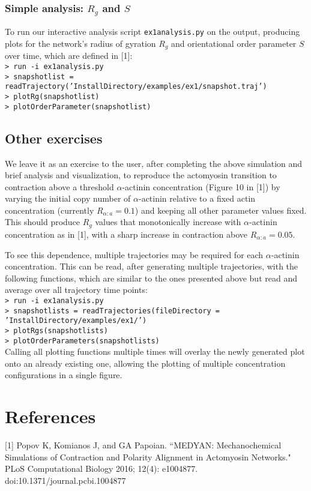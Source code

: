 \documentclass[11pt, oneside]{article}   	%
\begin{document}
\subsubsection{Simple analysis: $R_g$ and $S$}

To run our interactive analysis script \texttt{ex1analysis.py} on the output, producing plots for the network's radius of gyration $R_g$ and orientational order parameter $S$ over time, which are defined in [1]:\\

\indent \texttt{> run -i ex1analysis.py}\\
\indent \texttt{> snapshotlist = readTrajectory('InstallDirectory/examples/ex1/snapshot.traj')}\\
\indent \texttt{> plotRg(snapshotlist)}\\
\indent \texttt{> plotOrderParameter(snapshotlist)}\\

\subsection{Other exercises}

We leave it as an exercise to the user, after completing the above simulation and brief analysis and visualization, to reproduce the actomyosin transition to contraction above a threshold $\alpha$-actinin concentration (Figure 10 in [1]) by varying the initial copy number of $\alpha$-actinin relative to a fixed actin concentration (currently $R_{\alpha:a}=0.1$) and keeping all other parameter values fixed. This should produce $R_g$ values that monotonically increase with $\alpha$-actinin concentration as in [1], with a sharp increase in contraction above $R_{\alpha:a}=0.05$.

To see this dependence, multiple trajectories may be required for each $\alpha$-actinin concentration. This can be read, after generating multiple trajectories, with the following functions, which are similar to the ones presented above but read and average over all trajectory time points:\\

\indent \texttt{> run -i ex1analysis.py}\\
\indent \texttt{> snapshotlists = readTrajectories(fileDirectory = 'InstallDirectory/examples/ex1/')}\\
\indent \texttt{> plotRgs(snapshotlists)}\\
\indent \texttt{> plotOrderParameters(snapshotlists)}\\

\noindent Calling all plotting functions multiple times will overlay the newly generated plot onto an already existing one, allowing the plotting of multiple concentration configurations in a single figure. 

\section{References}

[1] Popov K, Komianos J, and GA Papoian. ``MEDYAN: Mechanochemical Simulations 
\indent of Contraction and Polarity Alignment in Actomyosin Networks." PLoS Computational \indent Biology 2016; 12(4): e1004877. doi:10.1371/journal.pcbi.1004877
\end{document}
